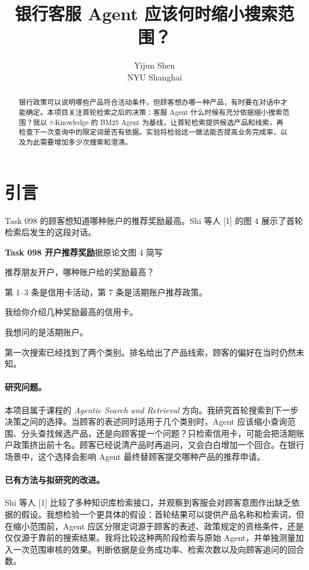 \documentclass{article}
\title{银行客服 Agent 应该何时缩小搜索范围？}
\author{Yijun Shen\\NYU Shanghai}
\newenvironment{tracecard}[2]{\par\addvspace{5pt}\noindent\begin{minipage}{\linewidth}
  \setlength{\parindent}{0pt}\small
  \colorbox{cardwash}{\parbox{\dimexpr\linewidth-2\fboxsep\relax}{\strut\textcolor{cardink}{\bfseries #1}\hfill #2}}\par\smallskip
}{\end{minipage}\par\addvspace{4pt}}
\newcommand{\turnline}[2]{\noindent\makebox[.17\linewidth][l]{\textcolor{cardink}{\bfseries #1}}\parbox[t]{.83\linewidth}{#2\strut}\par}
\begin{document}
\maketitle
\begin{abstract}
银行政策可以说明哪些产品符合活动条件，但顾客想办哪一种产品，有时要在对话中才能确定。本项目关注首轮检索之后的决策：客服 Agent 什么时候有充分依据缩小搜索范围？我以 $\tau$-Knowledge 的 BM25 Agent 为基线，让首轮检索提供候选产品和线索，再检查下一次查询中的限定词是否有依据。实验将检验这一做法能否提高业务完成率，以及为此需要增加多少次搜索和澄清。
\end{abstract}

\section{引言}
Task 098 的顾客想知道哪种账户的推荐奖励最高。Shi 等人 [1] 的图 4 展示了首轮检索后发生的这段对话。

\begin{tracecard}{Task 098 \enspace 开户推荐奖励}{据原论文图 4 简写}
\turnline{顾客}{推荐朋友开户，哪种账户给的奖励最高？}
\turnline{知识库}{第 1--3 条是信用卡活动，第 7 条是活期账户推荐政策。}
\turnline{客服}{我给你介绍几种奖励最高的信用卡。}
\turnline{顾客}{我想问的是活期账户。}
\end{tracecard}

第一次搜索已经找到了两个类别。排名给出了产品线索，顾客的偏好在当时仍然未知。

\paragraph{研究问题。} 本项目属于课程的 \emph{Agentic Search and Retrieval} 方向。我研究首轮搜索到下一步决策之间的选择。当顾客的表述同时适用于几个类别时，Agent 应该缩小查询范围、分头查找候选产品，还是向顾客提一个问题？只检索信用卡，可能会把活期账户政策挤出前十名。顾客已经说清产品时再追问，又会白白增加一个回合。在银行场景中，这个选择会影响 Agent 最终替顾客提交哪种产品的推荐申请。

\paragraph{已有方法与拟研究的改进。} Shi 等人 [1] 比较了多种知识库检索接口，并观察到客服会对顾客意图作出缺乏依据的假设。我想检验一个更具体的假设：首轮结果可以提供产品名称和检索词，但在缩小范围前，Agent 应区分限定词源于顾客的表述、政策规定的资格条件，还是仅仅源于靠前的搜索结果。我将比较这种两阶段检索与原始 Agent，并单独测量加入一次范围审核的效果。判断依据是业务成功率、检索次数以及向顾客追问的回合数。
\end{document}

